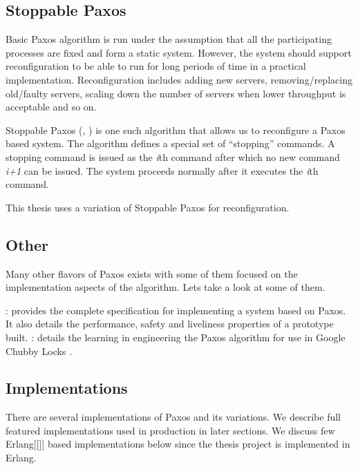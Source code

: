 \subsection{Stoppable Paxos}

Basic Paxos algorithm is run under the assumption that all the participating
processes are fixed and form a static system. However, the system should
support reconfiguration to be able to run for long periods of time in a
practical implementation. Reconfiguration includes adding new servers, 
removing/replacing old/faulty servers, scaling down the number of servers
when lower throughput is acceptable and so on.

Stoppable Paxos (\citet{LamportSP08}, \citet{LamportMZ10}) is one such algorithm
that allows us to reconfigure a Paxos based system. The algorithm defines a
special set of ``stopping'' commands. A stopping command is issued as the
\emph{i}th command after which no new command \emph{i+1} can be issued. The 
system proceeds normally after it executes the \emph{i}th command.

This thesis uses a variation of Stoppable Paxos for reconfiguration.

\subsection{Other}

Many other flavors of Paxos exists with some of them focused on the
implementation aspects of the algorithm. Lets take a look at some of them.

\begin{itemize}
    : \citet{Kirsch08paxosfor} provides the
    complete specification for implementing a system based on Paxos. It also
    details the performance, safety and liveliness properties of a prototype
    built.
    : \cite{ChandraGR07}
    details the learning in engineering the Paxos algorithm for use in
    Google Chubby Locks \citep{Burrows06}.
\end{itemize}

\subsection{Implementations}

There are several implementations of Paxos and its variations. We describe full
featured implementations used in production in later sections. We discuss few
Erlang[[]] based implementations below since the thesis project is implemented
in Erlang.


